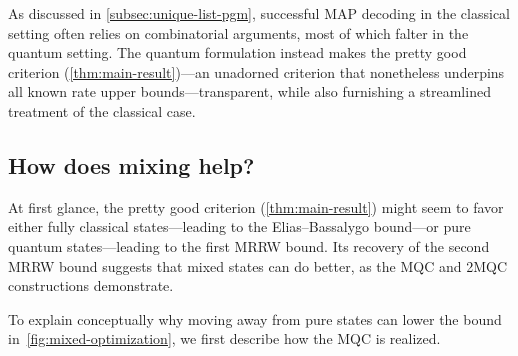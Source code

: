 \documentclass[11pt]{article}
\theoremstyle{remark}
\begin{document}
As discussed in \cref{subsec:unique-list-pgm}, successful MAP decoding in the classical setting often relies on combinatorial arguments, most of which falter in the quantum setting. The quantum formulation instead makes the pretty good criterion (\cref{thm:main-result})---an unadorned criterion that nonetheless underpins all known rate upper bounds---transparent, while also furnishing a streamlined treatment of the classical case.

\subsection{How does mixing help?}
\label{subsec:how-mixing}

At first glance, the pretty good criterion (\cref{thm:main-result}) might seem to favor either fully classical states---leading to the Elias--Bassalygo bound---or pure quantum states---leading to the first MRRW bound. Its recovery of the second MRRW bound suggests that mixed states can do better, as the MQC and 2MQC constructions demonstrate.

To explain conceptually why moving away from pure states can lower the bound in~\cref{fig:mixed-optimization}, we first describe how the MQC is realized.
\end{document}
